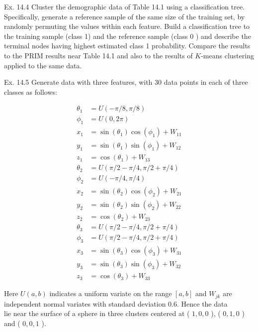 \documentclass[10pt]{article}
\begin{document}
Ex. 14.4 Cluster the demographic data of Table 14.1 using a classification tree. Specifically, generate a reference sample of the same size of the training set, by randomly permuting the values within each feature. Build a classification tree to the training sample (class 1) and the reference sample (class 0 ) and describe the terminal nodes having highest estimated class 1 probability. Compare the results to the PRIM results near Table 14.1 and also to the results of $K$-means clustering applied to the same data.

Ex. 14.5 Generate data with three features, with 30 data points in each of three classes as follows:

$$
\begin{aligned}
\theta_{1} & =U(-\pi / 8, \pi / 8) \\
\phi_{1} & =U(0,2 \pi) \\
x_{1} & =\sin \left(\theta_{1}\right) \cos \left(\phi_{1}\right)+W_{11} \\
y_{1} & =\sin \left(\theta_{1}\right) \sin \left(\phi_{1}\right)+W_{12} \\
z_{1} & =\cos \left(\theta_{1}\right)+W_{13} \\
\theta_{2} & =U(\pi / 2-\pi / 4, \pi / 2+\pi / 4) \\
\phi_{2} & =U(-\pi / 4, \pi / 4) \\
x_{2} & =\sin \left(\theta_{2}\right) \cos \left(\phi_{2}\right)+W_{21} \\
y_{2} & =\sin \left(\theta_{2}\right) \sin \left(\phi_{2}\right)+W_{22} \\
z_{2} & =\cos \left(\theta_{2}\right)+W_{23} \\
\theta_{3} & =U(\pi / 2-\pi / 4, \pi / 2+\pi / 4) \\
\phi_{3} & =U(\pi / 2-\pi / 4, \pi / 2+\pi / 4) \\
x_{3} & =\sin \left(\theta_{3}\right) \cos \left(\phi_{3}\right)+W_{31} \\
y_{3} & =\sin \left(\theta_{3}\right) \sin \left(\phi_{3}\right)+W_{32} \\
z_{3} & =\cos \left(\theta_{3}\right)+W_{33}
\end{aligned}
$$

Here $U(a, b)$ indicates a uniform variate on the range $[a, b]$ and $W_{j k}$ are independent normal variates with standard deviation 0.6. Hence the data\\
lie near the surface of a sphere in three clusters centered at ( $1,0,0$ ), ( $0,1,0$ ) and ( $0,0,1$ ).
\end{document}
